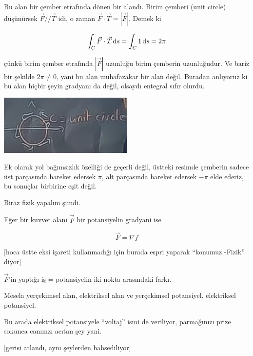 \documentclass[12pt,fleqn]{article}\usepackage{../../common}
\begin{document}
Bu alan bir çember etrafında dönen bir alandı. Birim çemberi (unit circle)
düşünürsek $\vec{F} // \vec{T}$ idi, o zaman $\vec{F}\cdot\vec{T} =
|\vec{F}|$. Demek ki

$$ \int_C \vec{F}\cdot\vec{T} \,\mathrm{d} s = \int_C 1 \,\mathrm{d} s = 2\pi $$

çünkü birim çember etrafında $|\vec{F}|$ uzunluğu birim çemberin uzunluğudur. Ve
bariz bir şekilde $2\pi \ne 0$, yani bu alan muhafazakar bir alan değil. Buradan
anlıyoruz ki bu alan hiçbir şeyin gradyanı da değil, olsaydı entegral sıfır
olurdu.

\begin{center}
\includegraphics[height=3cm]{20_9.png}
\end{center}

Ek olarak yol bağımsızlık özelliği de geçerli değil, üstteki resimde çemberin
sadece üst parçasında hareket edersek $\pi$, alt parçasında hareket edersek
$-\pi$ elde ederiz, bu sonuçlar birbirine eşit değil.

Biraz fizik yapalım şimdi.

Eğer bir kuvvet alanı $\vec{F}$ bir potansiyelin gradyani ise 

$$ \vec{F} = \nabla f $$

[hoca üstte eksi işareti kullanmadığı için burada espri yaparak ``konumuz
-Fizik'' diyor]

$\vec{F}$'in yaptığı iş = potansiyelin iki nokta arasındaki farkı. 

Mesela yerçekimsel alan, elektriksel alan ve yerçekimsel potansiyel,
elektriksel potansiyel. 

Bu arada elektriksel potansiyele ``voltaj'' ismi de veriliyor, parmağınızı
prize sokunca canınızı acıtan şey yani. 

[gerisi atlandı, aynı şeylerden bahsediliyor]
\end{document}
